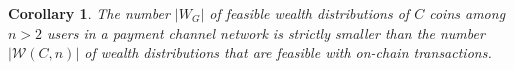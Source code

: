 \documentclass[10pt,twocolumn]{article}
\newtheorem{corollary}{Corollary}[theorem]
\begin{document}




\begin{corollary}
The number \( |W_G| \) of feasible wealth distributions of \( C \) coins among \( n > 2 \) users in a payment channel network is strictly smaller than the number \( |\mathcal{W}(C,n)| \) of wealth distributions that are feasible with on-chain transactions.
\end{corollary}
\end{document}

